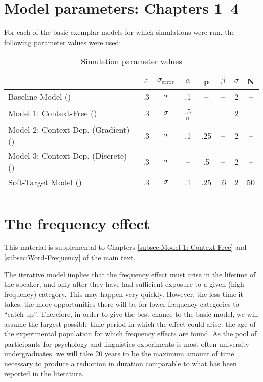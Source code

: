 \chapter{\label{chap:Appendix A}Model parameters: Chapters 1--4}

For each of the basic exemplar models for which simulations were run,
the following parameter values were used:

\begin{table}[H]\footnotesize
\caption{Simulation parameter values}
\begin{tabular}{lS[table-format=1.1]cS[table-format=1.1]S[table-format=1.1]S[table-format=1.1]cc}
\lsptoprule
 & {$\varepsilon$} & {$\sigma_{\text{error}}$} & $\alpha$ & {p} & {$\beta$} & $\sigma$ & N\tabularnewline
\midrule
Baseline Model () & .3 & $\sigma$ & .1 & – & – & 2 & –\tabularnewline
Model 1: Context-Free () & .3 & $\sigma$ & .5$\sigma$ & – & – & 2 & –\tabularnewline
Model 2: Context-Dep. (Gradient) () & .3 & $\sigma$ & .1 & .25 & – & 2 & –\tabularnewline
Model 3: Context-Dep. (Discrete) () & .3 & $\sigma$ & – & .5 & – & 2 & –\tabularnewline
Soft-Target Model () & .3 & $\sigma$ & .1 & .25 & .6 & 2 & 50\tabularnewline
\lspbottomrule
\end{tabular}

\end{table}


\chapter{\label{chap:Appendix B}The frequency effect}

This material is supplemental to Chapters \ref{subsec:Model-1:-Context-Free}
and \ref{subsec:Word-Frequency} of the main text.

The iterative model implies that the frequency effect must arise in
the lifetime of the speaker, and only after they have had sufficient
exposure to a given (high frequency) category. This may happen very
quickly. However, the less time it takes, the more opportunities there
will be for lower-frequency categories to “catch up”. Therefore,
in order to give the best chance to the basic model, we will assume
the largest possible time period in which the effect could arise:
the age of the experimental population for which frequency effects
are found. As the pool of participants for psychology and linguistics
experiments is most often university undergraduates, we will take
20 years to be the maximum amount of time necessary to produce a reduction
in duration comparable to what has been reported in the literature.

